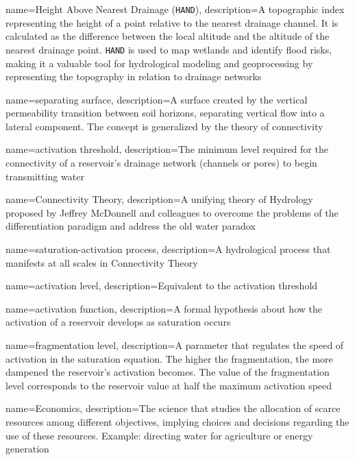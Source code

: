 {
    name=Height Above Nearest Drainage (\texttt{HAND}),
    description={A topographic index representing the height of a point relative to the nearest drainage channel. It is calculated as the difference between the local altitude and the altitude of the nearest drainage point. \texttt{HAND} is used to map wetlands and identify flood risks, making it a valuable tool for hydrological modeling and geoprocessing by representing the topography in relation to drainage networks}
}

{
    name=separating surface,
    description={A surface created by the vertical permeability transition between soil horizons, separating vertical flow into a lateral component. The concept is generalized by the theory of connectivity}
}

{
    name=activation threshold,
    description={The minimum level required for the connectivity of a reservoir's drainage network (channels or pores) to begin transmitting water}
}

{
    name=Connectivity Theory,
    description={A unifying theory of Hydrology proposed by Jeffrey McDonnell and colleagues to overcome the problems of the differentiation paradigm and address the old water paradox}
}

{
    name=saturation-activation process,
    description={A hydrological process that manifests at all scales in Connectivity Theory}
}

{
    name=activation level,
    description={Equivalent to the activation threshold}
}

{
    name=activation function,
    description={A formal hypothesis about how the activation of a reservoir develops as saturation occurs}
}

{
    name=fragmentation level,
    description={A parameter that regulates the speed of activation in the saturation equation. The higher the fragmentation, the more dampened the reservoir's activation becomes. The value of the fragmentation level corresponds to the reservoir value at half the maximum activation speed}
}


{
	name=Economics,
	description={The science that studies the allocation of scarce resources among different objectives, implying choices and decisions regarding the use of these resources. Example: directing water for agriculture or energy generation}
}

